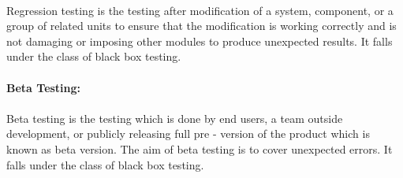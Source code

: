 \documentclass[11pt,a4paper]{report}
\begin{document}
\paragraph{}Regression testing is the testing after modification of a system, component, or a group of related units to ensure that the modification is working correctly and is not damaging or imposing other modules to produce unexpected results. It falls under the class of black box testing.\\
\textbf{\\Beta Testing:\\}
\paragraph{}Beta testing is the testing which is done by end users, a team outside development, or publicly releasing full pre - version of the product which is known as beta version. The aim of beta testing is to cover unexpected errors. It falls under the class of black box testing.
\end{document}
